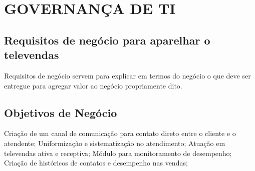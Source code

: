 \chapter{GOVERNANÇA DE TI}
\thispagestyle{empty}

\section{Requisitos de negócio para aparelhar o televendas}

\noindent Requisitos de negócio servem para explicar em termos do negócio 
	  o que deve ser entregue para agregar valor ao negócio propriamente 
	  dito.

\section{Objetivos de Negócio}

\noindent \subitem Criação de um canal de comunicação para contato direto entre o cliente e o atendente;
	  \subitem Uniformização e sistematização no atendimento;
	  \subitem Atuação em televendas ativa e receptiva;
	  \subitem Módulo para monitoramento de desempenho;
	  \subitem Criação de históricos de contatos e desempenho nas vendas;


\noindent